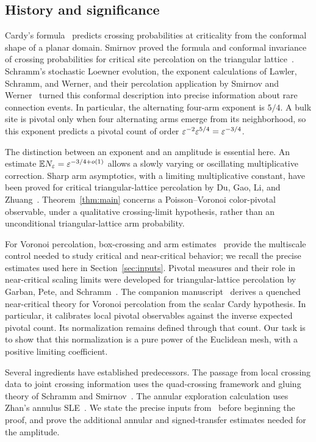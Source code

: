 \subsection{History and significance}
Cardy's formula~\cite{Cardy} predicts crossing probabilities at criticality
from the conformal shape of a planar domain. Smirnov proved the formula
and conformal invariance of crossing probabilities for critical site percolation on the triangular
lattice~\cite{Smirnov}. Schramm's stochastic Loewner evolution,
the exponent calculations of Lawler, Schramm, and Werner, and their
percolation application by Smirnov and Werner~\cite{Schramm,LSW,SW}
turned this conformal description into precise information about rare
connection events. In particular, the alternating four-arm exponent is $5/4$.
A bulk site is pivotal only when four alternating arms emerge from its
neighborhood, so this exponent predicts a pivotal count of order
$\varepsilon^{-2}\varepsilon^{5/4}=\varepsilon^{-3/4}$.

The distinction between an exponent and an amplitude is essential here.
An estimate $\mathbb E N_\varepsilon=\varepsilon^{-3/4+o(1)}$ allows a slowly varying or
oscillating multiplicative correction. Sharp arm asymptotics, with a
limiting multiplicative constant, have been proved for critical
triangular-lattice percolation by Du, Gao, Li, and Zhuang~\cite{DGLZ}.
Theorem~\ref{thm:main} concerns a Poisson--Voronoi color-pivotal
observable, under a qualitative crossing-limit hypothesis, rather than
an unconditional triangular-lattice arm probability.

For Voronoi percolation, box-crossing and arm estimates~\cite{Tassion,Vanneuville} provide the
multiscale control needed to study critical and near-critical behavior;
we recall the precise estimates used here in Section~\ref{sec:inputs}.
Pivotal measures and their role in near-critical scaling limits were
developed for triangular-lattice percolation by Garban, Pete, and
Schramm~\cite{GPS}. The companion manuscript~\cite{V} derives a
quenched near-critical theory for Voronoi percolation from the scalar
Cardy hypothesis. In particular, it calibrates local pivotal
observables against the inverse expected pivotal count. Its
normalization remains defined through that count. Our task is to show
that this normalization is a pure power of the Euclidean mesh, with a
positive limiting coefficient.

Several ingredients have established predecessors. The passage from
local crossing data to joint crossing information uses the
quad-crossing framework and gluing theory of Schramm and
Smirnov~\cite{SS}. The annular exploration calculation uses Zhan's
annulus SLE~\cite{Zhan}. We state the precise inputs from~\cite{V}
before beginning the proof, and prove the additional annular and
signed-transfer estimates needed for the amplitude.

